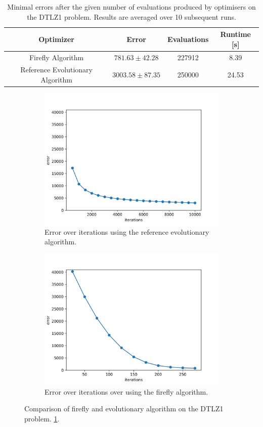 \begin{table}[H]
  \centering
   \begin{tabular}{|c c c c|}
     \hline
     \textbf{Optimizer} & \textbf{Error} & \textbf{Evaluations} & \textbf{Runtime [s]} \\
     \hline
     Firefly Algorithm & $781.63 \pm 42.28$ & 227912 & 8.39 \\
     Reference Evolutionary Algorithm & $3003.58 \pm 87.35$ & 250000 & 24.53 \\
     \hline
  \end{tabular}
  \caption{Minimal errors after the given number of evaluations produced by optimisers on the DTLZ1 problem. Results are averaged over 10 subsequent runs.}
  \label{tab:firefly_vs_ea}
\end{table}

\begin{figure}
  \centering
  \begin{subfigure}{.5\textwidth}
    \centering
    \includegraphics[width=0.75\linewidth]{assets/reference.png}
    \caption{Error over iterations using the reference evolutionary algorithm.}
    \label{fig:sub1}
  \end{subfigure}%
  \begin{subfigure}{.5\textwidth}
    \centering
    \includegraphics[width=0.75\linewidth]{assets/firefly.png}
    \caption{Error over iterations over using the firefly algorithm.}
    \label{fig:sub2}
  \end{subfigure}
  \caption{Comparison of firefly and evolutionary algorithm on the DTLZ1 problem. \ref{tab:firefly_vs_ea}.}
  \label{fig:firefly_vs_ea}
\end{figure}

